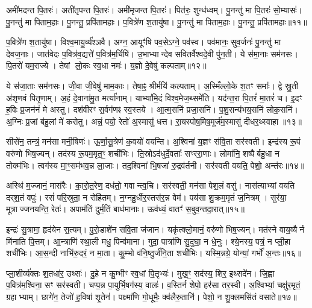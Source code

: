 अमी॑मदन्त पि॒तरः॑।
अती॑तृपन्त पि॒तरः॑।
अमी॑मृजन्त पि॒तरः॑।
पित॑रः॒ शुन्ध॑ध्वम्।
पु॒नन्तु॑ मा पि॒तरः॑ सो॒म्यासः॑।
पु॒नन्तु॑ मा पिताम॒हाः।
पु॒नन्तु॒ प्रपि॑तामहाः।
प॒वित्रे॑ण श॒तायु॑षा।
पु॒नन्तु॑ मा पिताम॒हाः।
पु॒नन्तु॒ प्रपि॑तामहाः॥११॥

प॒वित्रे॑ण श॒तायु॑षा।
विश्व॒मायु॒र्व्य॑श्ञवै।
अग्न॒ आयूꣳ॑षि पव॒से\-ऽग्ने॒ पव॑स्व।
पव॑मानः॒ सुव॒र्जनः॑ पु॒नन्तु॑ मा देवज॒नाः।
जात॑वेदः प॒वित्र॑व॒द्यत्ते॑ प॒वित्र॑म॒र्चिषि॑।
उ॒भाभ्यान्देव सवितर्वैश्वदे॒वी पु॑न॒ती।
ये स॑मा॒नाः सम॑नसः।
पि॒तरो॑ यम॒राज्ये।
तेषां लो॒कः स्व॒धा नमः॑।
य॒ज्ञो दे॒वेषु॑ कल्पताम्॥१२॥

ये स॑जा॒ताः सम॑नसः।
जी॒वा जी॒वेषु॑ माम॒काः।
तेषा॒ꣴ॒ श्रीर्मयि॑ कल्पताम्।
अ॒स्मिँल्लो॒के श॒तꣳ समाः᳚।
द्वे स्रु॒ती अ॑शृणवं पितृ॒णाम्।
अ॒हं दे॒वाना॑मु॒त मर्त्या॑नाम्।
याभ्या॑मि॒दं विश्व॒मेज॒थ्समे॑ति।
यद॑न्त॒रा पि॒तरं॑ मा॒तरं॑ च।
इ॒दꣳ ह॒विः प्र॒जन॑नं मे अस्तु।
दश॑वीरꣳ स॒र्वग॑णꣴ स्व॒स्तये।
आ॒त्म॒सनि॑ प्रजा॒सनि॑।
प॒शु॒सन्य॑भय॒सनि॑ लोक॒सनि॑।
अ॒ग्निः प्र॒जां ब॑हु॒लां मे॑ करोतु।
अन्नं॒ पयो॒ रेतो॑ अ॒स्मासु॑ धत्त।
रा॒यस्पोष॒मिष॒मूर्ज॑म॒स्मासु॑ दीधर॒थ्स्वाहा॥१३॥\anuvakamend[इ॒न्द्रि॒याय॑ पि॒तरः॑ श॒तायु॑षा पु॒नन्तु॑ मा पिताम॒हाः पु॒नन्तु॒ प्रपि॑तामहाः कल्पताꣳ स्व॒स्तये॒ पञ्च॑ च]

सीसे॑न॒ तन्त्रं॒ मन॑सा मनी॒षिणः॑।
ऊ॒र्णा॒सू॒त्रेण॑ क॒वयो॑ वयन्ति।
अ॒श्विना॑ य॒ज्ञꣳ स॑वि॒ता सर॑स्वती।
इन्द्र॑स्य रू॒पं वरु॑णो भिष॒ज्यन्।
तद॑स्य रू॒पम॒मृत॒ꣳ॒ शची॑भिः।
ति॒स्रो\-ऽद॑धुर्दे॒वताः᳚ सꣳररा॒णाः।
लोमा॑नि॒ शष्पैर्बहु॒धा न तोक्म॑भिः।
त्वग॑स्य मा॒ꣳ॒सम॑भव॒न्न ला॒जाः।
तद॒श्विना॑ भि॒षजा॑ रु॒द्रव॑र्तनी।
सर॑स्वती वयति॒ पेशो॒ अन्त॑रः॥१४॥

अस्थि॑ म॒ज्जानं॒ मास॑रैः।
का॒रो॒त॒रेण॒ दध॑तो॒ गवान्त्व॒चि।
सर॑स्वती॒ मन॑सा पेश॒लं वसु॑।
नास॑त्याभ्यां वयति दर्‌\mbox{}श॒तं वपुः॑।
रसं॑ परि॒स्रुता॒ न रोहि॑तम्।
न॒ग्नहु॒र्धीर॒स्तस॑र॒न्न वेम॑।
पय॑सा शु॒क्रम॒मृतं॑ ज॒नित्रम्।
सुर॑या॒ मूत्राज्जनयन्ति॒ रेतः॑।
अपाम॑तिं दुर्म॒तिं बाध॑मानाः।
ऊव॑ध्यं॒ वातꣳ॑ स॒बुव॒न्तदा॒रात्॥१५॥

इन्द्रः॑ सु॒त्रामा॒ हृद॑येन स॒त्यम्।
पु॒रो॒डाशे॑न सवि॒ता ज॑जान।
यकृ॑त्क्लो॒मानं॒ वरु॑णो भिष॒ज्यन्।
मत॑स्ने वाय॒व्यैर्न मि॑नाति पि॒त्तम्।
आ॒न्त्राणि॑ स्था॒ली मधु॒ पिन्व॑माना।
गुदा॒ पात्रा॑णि सु॒दुघा॒ न धे॒नुः।
श्ये॒नस्य॒ पत्रं॒ न प्ली॒हा शची॑भिः।
आ॒स॒न्दी नाभि॑रु॒दरं॒ न मा॒ता।
कु॒म्भो व॑नि॒ष्ठुर्ज॑नि॒ता शची॑भिः।
यस्मि॒न्नग्रे॒ योन्यां॒ गर्भो॑ अ॒न्तः॥१६॥

प्ला॒शीर्व्य॑क्तः श॒तधा॑र॒ उथ्सः॑।
दु॒हे न कु॒म्भीꣳ स्व॒धां पि॒तृभ्यः॑।
मुख॒ꣳ॒ सद॑स्य॒ शिर॒ इथ्सदे॑न।
जि॒ह्वा प॒वित्र॑म॒श्विना॒ सꣳ सर॑स्वती।
चप्प॒न्न पा॒युर्भि॒षग॑स्य॒ वालः॑।
व॒स्तिर्न शेपो॒ हर॑सा तर॒स्वी।
अ॒श्विभ्यां॒ चक्षु॑र॒मृतं॒ ग्रहाभ्याम्।
छागे॑न॒ तेजो॑ ह॒विषा॑ शृ॒तेन॑।
पक्ष्मा॑णि गो॒धूमैः॒ क्व॑लैरु॒तानि॑।
पेशो॒ न शु॒क्लमसि॑तं वसाते॥१७॥

